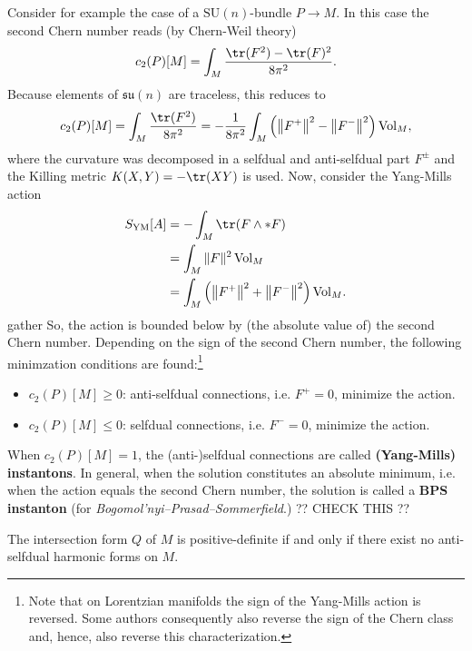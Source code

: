     Consider for example the case of a $\mathrm{SU}(n)$-bundle $P\rightarrow M$. In this case the second Chern number reads (by Chern-Weil theory)
    \begin{gather}
        c_2(P)[M] = \int_M\frac{\tr(F^2)-\tr(F)^2}{8\pi^2}.
    \end{gather}
    Because elements of $\mathfrak{su}(n)$ are traceless, this reduces to
    \begin{gather}
        c_2(P)[M] = \int_M\frac{\tr(F^2)}{8\pi^2}=-\frac{1}{8\pi^2}\int_M\left(\left\|F^+\right\|^2-\left\|F^-\right\|^2\right)\mathrm{Vol}_M,
    \end{gather}
    where the curvature was decomposed in a selfdual and anti-selfdual part $F^\pm$ and the Killing metric $K(X,Y)=-\tr(XY)$ is used. Now, consider the Yang-Mills action
    \begin{align*}
        S_\mathrm{YM}[A] &= -\int_M\tr(F\wedge\ast F)\\
        &= \int_M\|F\|^2\,\mathrm{Vol}_M\\
        &= \int_M\left(\left\|F^+\right\|^2+\left\|F^-\right\|^2\right)\mathrm{Vol}_M.
    \end{align*}{gather}
    So, the action is bounded below by (the absolute value of) the second Chern number. Depending on the sign of the second Chern number, the following minimzation conditions are found:\footnote{Note that on Lorentzian manifolds the sign of the Yang-Mills action is reversed. Some authors consequently also reverse the sign of the Chern class and, hence, also reverse this characterization.}
    \begin{itemize}
        \item $c_2(P)[M]\geq0$: anti-selfdual connections, i.e. $F^+=0$, minimize the action.
        \item $c_2(P)[M]\leq0$: selfdual connections, i.e. $F^-=0$, minimize the action.
    \end{itemize}
    When $c_2(P)[M]=1$, the (anti-)selfdual connections are called \textbf{(Yang-Mills) instantons}. In general, when the solution constitutes an absolute minimum, i.e. when the action equals the second Chern number, the solution is called a \textbf{BPS instanton} (for \textit{Bogomol'nyi–Prasad–Sommerfield}.)  ?? CHECK THIS ??

    \begin{property}
        The intersection form $Q$ of $M$ is positive-definite if and only if there exist no anti-selfdual harmonic forms on $M$.
    \end{property}

